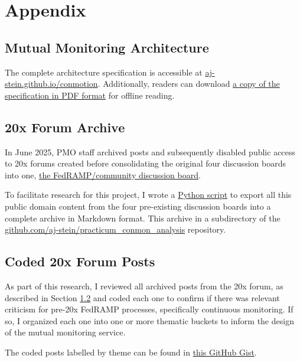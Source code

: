 \documentclass{jdf}
\begin{document}



\section{Appendix}

\subsection{Mutual Monitoring Architecture} \label{architecture}

The complete architecture specification is accessible at \href{https://aj-stein.github.io/conmotion/architecture.html}{aj-stein.github.io/conmotion}. Additionally, readers can download \href{https://aj-stein.github.io/conmotion/architecture.pdf}{a copy of the specification in PDF format} for offline reading.

\subsection{20x Forum Archive} \label{20x_archive}

In June 2025, PMO staff archived posts and subsequently disabled public access to 20x forums created before consolidating the original four discussion boards into one, \href{https://github.com/FedRAMP/community/discussions}{the FedRAMP/community discussion board}.

To facilitate research for this project, I wrote a \href{https://github.com/aj-stein/practicum_conmon_analysis/blob/e0baba42dda242b137fa7ab583a3ceaecaf1e94f/src/download_discussions.py}{Python script} to export all this public domain content from the four pre-existing discussion boards into a complete archive in Markdown format. This archive in a subdirectory of the \href{https://github.com/aj-stein/practicum\_conmon\_analysis/tree/e0baba42dda242b137fa7ab583a3ceaecaf1e94f/data/fedramp}{github.com/aj-stein/practicum\_conmon\_analysis} repository.

\subsection{Coded 20x Forum Posts} \label{20x_archive_coded}

As part of this research, I reviewed all archived posts from the 20x forum, as described in Section \ref{20x_archive} and coded each one to confirm if there was relevant criticism for pre-20x FedRAMP processes, specifically continuous monitoring. If so, I organized each one into one or more thematic buckets to inform the design of the mutual monitoring service.

The coded posts labelled by theme can be found in \href{https://gist.github.com/aj-stein/ffa8bdbe5674a59159d4850aa16fb142}{this GitHub Gist}.
\end{document}
